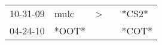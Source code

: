 \begin{supertabular}{p{0.07\textwidth}p{0.06\textwidth}p{0.02\textwidth}p{0.02\textwidth}p{0.06\textwidth}}
 10-31-09\textsuperscript{} &  mulc\textsuperscript{} &  \textgreater &   &  *CS2* \\
 04-24-10\textsuperscript{} &                   *OOT* &               &   &  *COT* \\
\end{supertabular}
